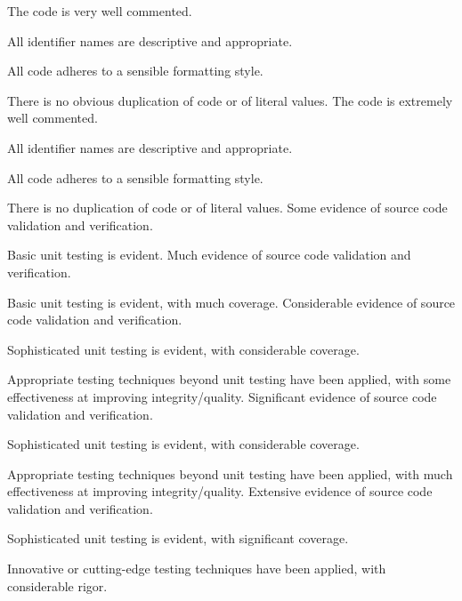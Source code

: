\documentclass{../fal_assignment}
\begin{document}
\begin{markingrubric}
        \grade The code is very well commented.
            \par All identifier names are descriptive and appropriate.
            \par All code adheres to a sensible formatting style.
             \par There is no obvious duplication of code or of literal values.
        \grade The code is extremely well commented.
            \par All identifier names are descriptive and appropriate.
            \par All code adheres to a sensible formatting style.
            \par There is no duplication of code or of literal values.
%
        \grade \fail 
        \grade Some evidence of source code validation and verification.
            \par Basic unit testing is evident.       
        \grade Much evidence of source code validation and verification.
            \par Basic unit testing is evident, with much coverage.
        \grade Considerable evidence of source code validation and verification.
            \par Sophisticated unit testing is evident, with considerable coverage.
            \par Appropriate testing techniques beyond unit testing have been applied, with some effectiveness at improving integrity/quality.
        \grade Significant evidence of source code validation and verification.
            \par Sophisticated unit testing is evident, with considerable coverage.
            \par Appropriate testing techniques beyond unit testing have been applied, with much effectiveness at improving integrity/quality.
        \grade Extensive evidence of source code validation and verification.
            \par Sophisticated unit testing is evident, with significant coverage.
            \par Innovative or cutting-edge testing techniques have been applied, with considerable rigor.
            
\end{markingrubric}
\end{document}
